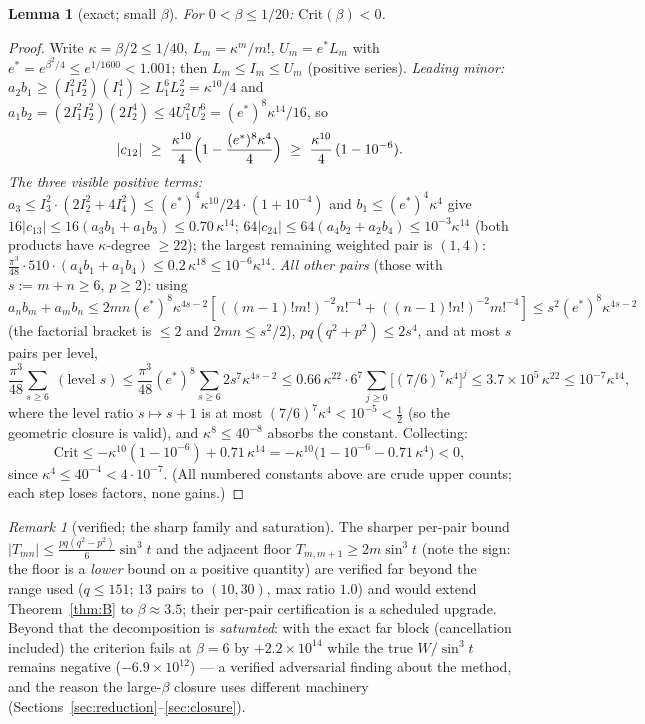 \documentclass[11pt]{article}
\newtheorem{lemma}[theorem]{Lemma}
\theoremstyle{remark}
\newtheorem{remark}[theorem]{Remark}
\begin{document}
\begin{lemma}[exact; small $\beta$]\label{lem:smallbeta}
For $0<\beta\le1/20$:\; $\mathrm{Crit}(\beta)<0$.
\end{lemma}

\begin{proof}
Write $\kappa=\beta/2\le1/40$, $L_m=\kappa^m/m!$,
$U_m=e^*L_m$ with $e^*=e^{\beta^2/4}\le e^{1/1600}<1.001$; then
$L_m\le I_m\le U_m$ (positive series). \emph{Leading minor:}
$a_2b_1\ge(I_1^2I_2^2)(I_1^4)\ge L_1^6L_2^2=\kappa^{10}/4$ and
$a_1b_2=(2I_1^2I_2^2)(2I_2^4)\le4U_1^2U_2^6=(e^*)^8\kappa^{14}/16$,
so
\[
|c_{12}|\ \ge\ \frac{\kappa^{10}}{4}
\Bigl(1-\frac{(e^*)^8\kappa^4}{4}\Bigr)
\ \ge\ \frac{\kappa^{10}}{4}\,(1-10^{-6}).
\]
\emph{The three visible positive terms:}
$a_3\le I_3^2\cdot(2I_2^2+4I_4^2)\le(e^*)^4\kappa^{10}/24\cdot(1+10^{-4})$
and $b_1\le(e^*)^4\kappa^4$ give
$16|c_{13}|\le16(a_3b_1+a_1b_3)\le0.70\,\kappa^{14}$;
$64|c_{24}|\le64(a_4b_2+a_2b_4)\le10^{-3}\kappa^{14}$ (both products
have $\kappa$-degree $\ge22$); the largest remaining weighted pair is
$(1,4)$: $\frac{\pi^3}{48}\cdot510\cdot(a_4b_1+a_1b_4)
\le0.2\,\kappa^{18}\le10^{-6}\kappa^{14}$.
\emph{All other pairs} (those with $s:=m+n\ge6$, $p\ge2$): using
$a_nb_m+a_mb_n\le2mn(e^*)^8\kappa^{4s-2}
[((m-1)!m!)^{-2}n!^{-4}+((n-1)!n!)^{-2}m!^{-4}]
\le s^2(e^*)^8\kappa^{4s-2}$ (the factorial bracket is $\le2$ and
$2mn\le s^2/2$), $pq(q^2+p^2)\le 2s^4$, and at most $s$ pairs per level,
\[
\frac{\pi^3}{48}\!\!\sum_{s\ge6}\!\!\;(\text{level }s)
\le\frac{\pi^3}{48}(e^*)^8\sum_{s\ge6}2s^7\kappa^{4s-2}
\le0.66\,\kappa^{22}\cdot6^7\sum_{j\ge0}\bigl[(7/6)^7\kappa^4\bigr]^j
\le3.7\times10^5\,\kappa^{22}\le10^{-7}\kappa^{14},
\]
where the level ratio $s\mapsto s+1$ is at most
$(7/6)^7\kappa^4<10^{-5}<\tfrac12$ (so the geometric closure is valid),
and $\kappa^{8}\le40^{-8}$ absorbs the constant. Collecting:
\[
\mathrm{Crit}\le-\kappa^{10}(1-10^{-6})+0.71\,\kappa^{14}
=-\kappa^{10}\bigl(1-10^{-6}-0.71\,\kappa^4\bigr)<0,
\]
since $\kappa^4\le40^{-4}<4\cdot10^{-7}$. (All numbered constants above
are crude upper counts; each step loses factors, none gains.)
\end{proof}

\begin{remark}[verified; the sharp family and saturation]
\label{rem:saturation}
The sharper per-pair bound $|T_{mn}|\le\frac{pq(q^2-p^2)}{6}\sin^3t$ and
the adjacent floor $T_{m,m+1}\ge2m\sin^3t$ \textup{(}note the sign: the
floor is a \emph{lower} bound on a positive quantity\textup{)} are
verified far beyond the range used ($q\le151$; $13$ pairs to $(10,30)$,
max ratio $1.0$) and would extend Theorem~\ref{thm:B} to
$\beta\approx3.5$; their per-pair certification is a scheduled upgrade.
Beyond that the decomposition is \emph{saturated}: with the exact far
block (cancellation included) the criterion fails at $\beta=6$ by
$+2.2\times10^{14}$ while the true $W/\sin^3t$ remains negative
($-6.9\times10^{12}$) --- a verified adversarial finding about the
method, and the reason the large-$\beta$ closure uses different
machinery (Sections~\ref{sec:reduction}--\ref{sec:closure}).
\end{remark}
\end{document}
